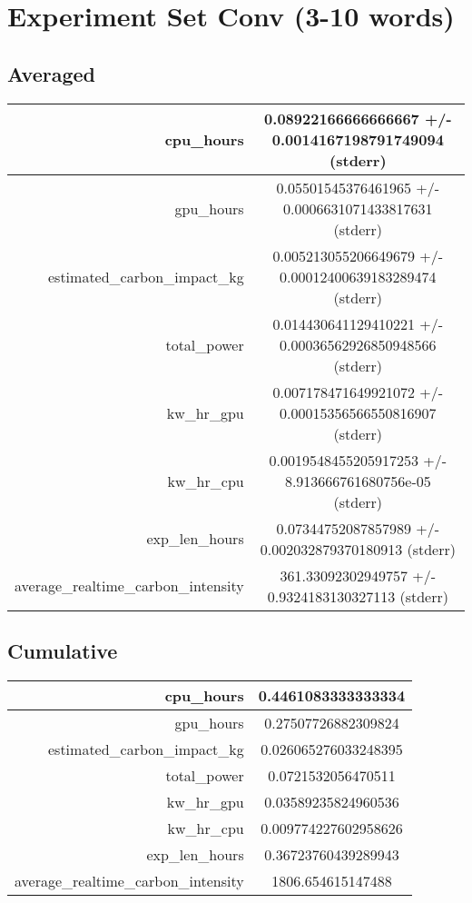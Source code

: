\documentclass{article}%
\begin{document}
%
\normalsize%
\section{Experiment Set Conv (3{-}10 words)}%
\label{sec:Experiment Set Conv (3{-}10 words)}%
\subsection{Averaged}%
\label{subsec:Averaged}%
\begin{tabular}{|r|c|}%
\hline%
cpu\_hours&0.08922166666666667 +/{-} 0.0014167198791749094 (stderr)\\%
\hline%
gpu\_hours&0.05501545376461965 +/{-} 0.0006631071433817631 (stderr)\\%
\hline%
estimated\_carbon\_impact\_kg&0.005213055206649679 +/{-} 0.00012400639183289474 (stderr)\\%
\hline%
total\_power&0.014430641129410221 +/{-} 0.00036562926850948566 (stderr)\\%
\hline%
kw\_hr\_gpu&0.007178471649921072 +/{-} 0.00015356566550816907 (stderr)\\%
\hline%
kw\_hr\_cpu&0.0019548455205917253 +/{-} 8.913666761680756e{-}05 (stderr)\\%
\hline%
exp\_len\_hours&0.07344752087857989 +/{-} 0.002032879370180913 (stderr)\\%
\hline%
average\_realtime\_carbon\_intensity&361.33092302949757 +/{-} 0.9324183130327113 (stderr)\\%
\hline%
\end{tabular}

%
\subsection{Cumulative}%
\label{subsec:Cumulative}%
\begin{tabular}{|r|c|}%
\hline%
cpu\_hours&0.4461083333333334\\%
\hline%
gpu\_hours&0.27507726882309824\\%
\hline%
estimated\_carbon\_impact\_kg&0.026065276033248395\\%
\hline%
total\_power&0.0721532056470511\\%
\hline%
kw\_hr\_gpu&0.03589235824960536\\%
\hline%
kw\_hr\_cpu&0.009774227602958626\\%
\hline%
exp\_len\_hours&0.36723760439289943\\%
\hline%
average\_realtime\_carbon\_intensity&1806.654615147488\\%
\hline%
\end{tabular}

%
\end{document}
